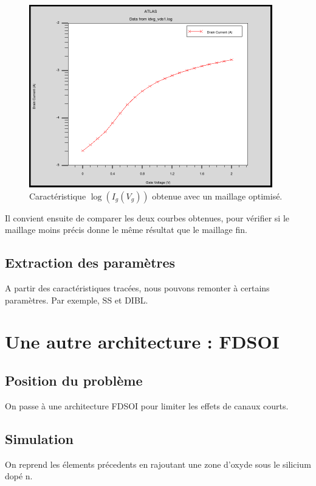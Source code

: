 \documentclass[a4paper,11pt]{report}
\begin{document}
\begin{figure}[H]
    \centering
    \includegraphics[width=300pt]{../meshOpti1/Log.png}
    \caption{Caractéristique $\log(I_g(V_g))$ obtenue avec un maillage optimisé.}
    \label{logIdVgmeshopti}
\end{figure}

Il convient ensuite de comparer les deux courbes obtenues, pour vérifier si le maillage moins précis donne le même résultat que le maillage fin.


\section{Extraction des paramètres}
A partir des caractéristiques tracées, nous pouvons remonter à certains paramètres. Par exemple, SS et DIBL.






\chapter{Une autre architecture : FDSOI}

\section{Position du problème}

On passe à une architecture FDSOI pour limiter les effets de canaux courts.


\section{Simulation}
On reprend les élements précedents en rajoutant une zone d'oxyde sous le silicium dopé n.
\end{document}
